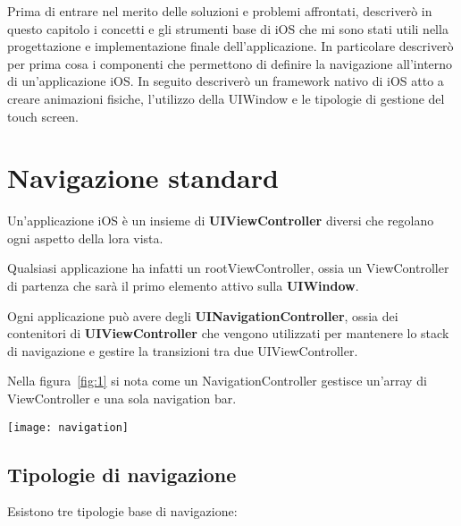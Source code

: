 

Prima di entrare nel merito delle soluzioni e problemi affrontati, descriverò in questo capitolo i concetti e
gli strumenti base di iOS che mi sono stati utili nella progettazione e implementazione finale dell'applicazione.
In particolare descriverò per prima cosa i componenti che permettono di definire la navigazione
all'interno di un'applicazione iOS. In seguito descriverò un framework nativo di iOS atto a creare animazioni
fisiche, l'utilizzo della UIWindow e le tipologie di gestione del touch screen.

\section{Navigazione standard}

Un'applicazione iOS è un insieme di \textbf{UIViewController}\cite{viewcontroller} diversi che 
regolano ogni aspetto della lora vista.

Qualsiasi applicazione ha infatti un rootViewController, ossia un ViewController di partenza
che sarà il primo elemento attivo sulla \textbf{UIWindow}.

Ogni applicazione può avere degli \textbf{UINavigationController}\cite{navigationcontroller},
ossia dei contenitori di \textbf{UIViewController} che vengono
utilizzati per mantenere lo stack di navigazione e gestire la transizioni tra due UIViewController.

Nella figura~\ref{fig:1} si nota come un NavigationController gestisce un'array di ViewController e una sola 
navigation bar. \\

\begin{minipage}{\linewidth}
    \centering
    \texttt{[image: navigation]}
    \label{fig:1}
\end{minipage}

\subsection{Tipologie di navigazione}\label{sec:navigation}

Esistono tre tipologie base di navigazione:

